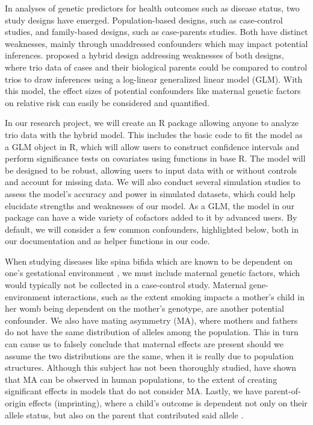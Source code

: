 \documentclass[12pt]{article}
\begin{document}
In analyses of genetic predictors for health outcomes such as disease status, two study designs have emerged.  Population-based designs, such as case-control studies, and family-based designs, such as case-parents studies.  Both have distinct weaknesses, mainly through unaddressed confounders which may impact potential inferences.  \cite{Wein05} proposed a hybrid design addressing weaknesses of both designs, where trio data of cases and their biological parents could be compared to control trios to draw inferences using a log-linear generalized linear model (GLM).  With this model, the effect sizes of potential confounders like maternal genetic factors on relative risk can easily be considered and quantified.

In our research project, we will create an R package allowing anyone to analyze trio data with the hybrid model.  This includes the basic code to fit the model as a GLM object in R, which will allow users to construct confidence intervals and perform significance tests on covariates using functions in base R.  The model will be designed to be robust, allowing users to input data with or without controls and account for missing data.  We will also conduct several simulation studies to assess the model's accuracy and power in simulated datasets, which could help elucidate strengths and weaknesses of our model.  As a GLM, the model in our package can have a wide variety of cofactors added to it by advanced users.  By default, we will consider a few common confounders, highlighted below, both in our documentation and as helper functions in our code.

When studying diseases like spina bifida which are known to be dependent on one's gestational environment \citep{Hobb14}, we must include maternal genetic factors, which would typically not be collected in a case-control study.  Maternal gene-environment interactions, such as the extent smoking impacts a mother's child in her womb being dependent on the mother's genotype, are another potential confounder. We also have mating asymmetry (MA), where mothers and fathers do not have the same distribution of alleles among the population.  This in turn can cause us to falsely conclude that maternal effects are present should we assume the two distributions are the same, when it is really due to population structures.  Although this subject has not been thoroughly studied, \cite{Bour+11} have shown that MA can be observed in human populations, to the extent of creating significant effects in models that do not consider MA.  Lastly, we have parent-of-origin effects (imprinting), where a child's outcome is dependent not only on their allele status, but also on the parent that contributed said allele \citep{Ains11}.

\newpage


\end{document}
